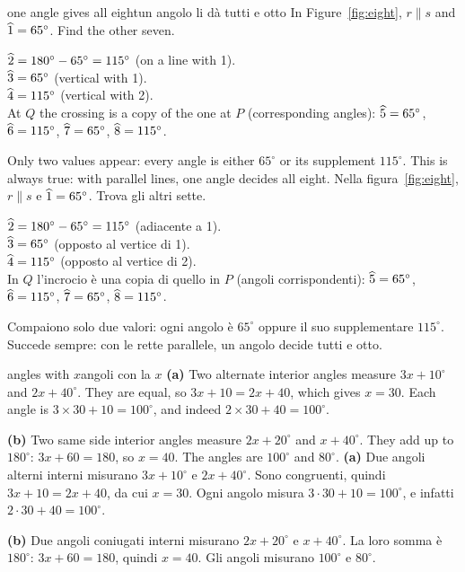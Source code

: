 \begin{example}{one angle gives all eight}{un angolo li dà tutti e otto}
In Figure~\ref{fig:eight}, $r \parallel s$ and $\widehat{1} = 65^\circ$. Find the other seven.

$\widehat{2} = 180^\circ - 65^\circ = 115^\circ$ (on a line with 1).\\
$\widehat{3} = 65^\circ$ (vertical with 1).\\
$\widehat{4} = 115^\circ$ (vertical with 2).\\
At $Q$ the crossing is a copy of the one at $P$ (corresponding angles): $\widehat{5} = 65^\circ$, $\widehat{6} = 115^\circ$, $\widehat{7} = 65^\circ$, $\widehat{8} = 115^\circ$.

Only two values appear: every angle is either $65^\circ$ or its supplement $115^\circ$. This is always true: with parallel lines, one angle decides all eight.
\tcblower
Nella figura~\ref{fig:eight}, $r \parallel s$ e $\widehat{1} = 65^\circ$. Trova gli altri sette.

$\widehat{2} = 180^\circ - 65^\circ = 115^\circ$ (adiacente a 1).\\
$\widehat{3} = 65^\circ$ (opposto al vertice di 1).\\
$\widehat{4} = 115^\circ$ (opposto al vertice di 2).\\
In $Q$ l'incrocio è una copia di quello in $P$ (angoli corrispondenti): $\widehat{5} = 65^\circ$, $\widehat{6} = 115^\circ$, $\widehat{7} = 65^\circ$, $\widehat{8} = 115^\circ$.

Compaiono solo due valori: ogni angolo è $65^\circ$ oppure il suo supplementare $115^\circ$. Succede sempre: con le rette parallele, un angolo decide tutti e otto.
\end{example}

\begin{example}{angles with $x$}{angoli con la $x$}
\textbf{(a)} Two alternate interior angles measure $3x + 10^\circ$ and $2x + 40^\circ$. They are equal, so $3x + 10 = 2x + 40$, which gives $x = 30$. Each angle is $3 \times 30 + 10 = 100^\circ$, and indeed $2 \times 30 + 40 = 100^\circ$.

\textbf{(b)} Two same side interior angles measure $2x + 20^\circ$ and $x + 40^\circ$. They add up to $180^\circ$: $3x + 60 = 180$, so $x = 40$. The angles are $100^\circ$ and $80^\circ$.
\tcblower
\textbf{(a)} Due angoli alterni interni misurano $3x + 10^\circ$ e $2x + 40^\circ$. Sono congruenti, quindi $3x + 10 = 2x + 40$, da cui $x = 30$. Ogni angolo misura $3 \cdot 30 + 10 = 100^\circ$, e infatti $2 \cdot 30 + 40 = 100^\circ$.

\textbf{(b)} Due angoli coniugati interni misurano $2x + 20^\circ$ e $x + 40^\circ$. La loro somma è $180^\circ$: $3x + 60 = 180$, quindi $x = 40$. Gli angoli misurano $100^\circ$ e $80^\circ$.
\end{example}

